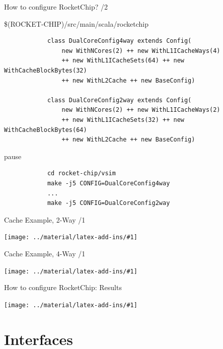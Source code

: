 \documentclass[]{beamer} %
\newcommand*{\COMPILEIMAGES}{}%
\newcommand\inputimage[1]{%
	\ifdefined\COMPILEIMAGES
		
	\else
		\texttt{[image: ../material/latex-add-ins/\#1]}
	\fi
	}
\newenvironment{fullpage}[0]{%
	\begin{list}{}{%
		\setlength{\leftmargin}{-7mm}%
		\setlength{\rightmargin}{-7mm}%
		\vspace*{-10pt}
		}%
\item[]}{\end{list}}
\begin{document}
\begin{frame}[fragile]{How to configure RocketChip? /2}
	\begin{fullpage}
	\$(ROCKET-CHIP)/src/main/scala/rocketchip
		\begin{verbatim}
			class DualCoreConfig4way extends Config(
				new WithNCores(2) ++ new WithL1ICacheWays(4)
				++ new WithL1ICacheSets(64) ++ new WithCacheBlockBytes(32)
				++ new WithL2Cache ++ new BaseConfig)

			class DualCoreConfig2way extends Config(
				new WithNCores(2) ++ new WithL1ICacheWays(2)
				++ new WithL1ICacheSets(32) ++ new WithCacheBlockBytes(64)
				++ new WithL2Cache ++ new BaseConfig)
		\end{verbatim}
		pause
		\begin{verbatim}
			cd rocket-chip/vsim
			make -j5 CONFIG=DualCoreConfig4way
			...
			make -j5 CONFIG=DualCoreConfig2way
		\end{verbatim}
	\end{fullpage}
\end{frame}




\begin{frame}{Cache Example, 2-Way /1}
	\begin{fullpage}
		\fourwayfalse
		\inputimage{image1}
	\end{fullpage}
\end{frame}

\begin{frame}{Cache Example, 4-Way /1}
	\begin{fullpage}
		\fourwaytrue
		\inputimage{image1}
	\end{fullpage}
\end{frame}


\begin{frame}[fragile]{How to configure RocketChip: Results}
	\begin{fullpage}
		\inputimage{image2}
	\end{fullpage}
\end{frame}





\section{Interfaces}
\end{document}
